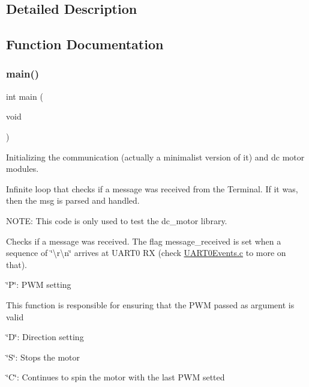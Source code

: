 \subsection{Detailed Description}


\subsection{Function Documentation}
\mbox{\label{group__main__module_ga840291bc02cba5474a4cb46a9b9566fe}} 
\subsubsection{\texorpdfstring{main()}{main()}}
{\footnotesize\ttfamily int main (\begin{DoxyParamCaption}\item[{void}]{ }\end{DoxyParamCaption})}

Initializing the communication (actually a minimalist version of it) and dc motor modules.

Infinite loop that checks if a message was received from the Terminal. If it was, then the msg is parsed and handled.

N\+O\+TE\+: This code is only used to test the dc\+\_\+motor library.

Checks if a message was received. The flag \textquotesingle{}message\+\_\+received\textquotesingle{} is set when a sequence of \char`\"{}\textbackslash{}r\textbackslash{}n\char`\"{} arrives at U\+A\+R\+T0 RX (check \hyperlink{_u_a_r_t0_events_8c}{U\+A\+R\+T0\+Events.\+c} to more on that).

\char`\"{}\+P\char`\"{}\+: P\+WM setting

This function is responsible for ensuring that the P\+WM passed as argument is valid

\char`\"{}\+D\char`\"{}\+: Direction setting

\char`\"{}\+S\char`\"{}\+: Stops the motor

\char`\"{}\+C\char`\"{}\+: Continues to spin the motor with the last P\+WM setted